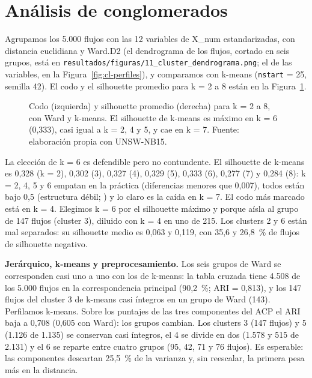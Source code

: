 \section{Análisis de conglomerados}
\label{sec:cluster}

Agrupamos los 5.000 flujos con las 12 variables de X\_num estandarizadas, con distancia euclidiana y Ward.D2 (el dendrograma de los flujos, cortado en seis grupos, está en \texttt{resultados/figuras/11\_cluster\_dendrograma.png}; el de las variables, en la Figura~\ref{fig:cl-perfiles}), y comparamos con k-means (\texttt{nstart} = 25, semilla 42). El codo y el silhouette promedio para k = 2 a 8 están en la Figura~\ref{fig:cl-seleccion}.

\begin{figure}[htbp]
  \centering
  \caption[Codo y silhouette para elegir k]{Codo (izquierda) y silhouette promedio (derecha) para k = 2 a 8, con Ward y k-means. El silhouette de k-means es máximo en k = 6 (0,333), casi igual a k = 2, 4 y 5, y cae en k = 7. Fuente: elaboración propia con UNSW-NB15.}
  \label{fig:cl-seleccion}
\end{figure}

La elección de k = 6 es defendible pero no contundente. El silhouette de k-means es 0,328 (k = 2), 0,302 (3), 0,327 (4), 0,329 (5), 0,333 (6), 0,277 (7) y 0,284 (8): k = 2, 4, 5 y 6 empatan en la práctica (diferencias menores que 0,007), todos están bajo 0,5 (estructura débil; \citealp{kaufman1990}) y lo claro es la caída en k = 7. El codo más marcado está en k = 4. Elegimos k = 6 por el silhouette máximo y porque aísla al grupo de 147 flujos (cluster 3), diluido con k = 4 en uno de 215. Los clusters 2 y 6 están mal separados: su silhouette medio es 0,063 y 0,119, con 35,6 y 26,8~\% de flujos de silhouette negativo.

\textbf{Jerárquico, k-means y preprocesamiento.} Los seis grupos de Ward se corresponden casi uno a uno con los de k-means: la tabla cruzada tiene 4.508 de los 5.000 flujos en la correspondencia principal (90,2~\%; ARI = 0,813), y los 147 flujos del cluster 3 de k-means casi íntegros en un grupo de Ward (143). Perfilamos k-means. Sobre los puntajes de las tres componentes del ACP el ARI baja a 0,708 (0,605 con Ward): los grupos cambian. Los clusters 3 (147 flujos) y 5 (1.126 de 1.135) se conservan casi íntegros, el 4 se divide en dos (1.578 y 515 de 2.131) y el 6 se reparte entre cuatro grupos (95, 42, 71 y 76 flujos). Es esperable: las componentes descartan 25,5~\% de la varianza y, sin reescalar, la primera pesa más en la distancia.

